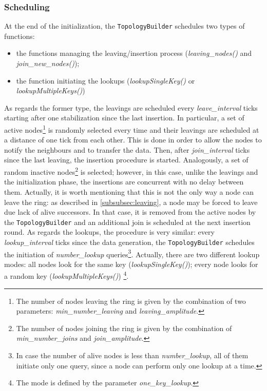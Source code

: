 \documentclass[11pt,twocolumn,letterpaper]{article}
\begin{document}
	\subsubsection{Scheduling}
	\label{subsubsec:top-scheduling}
	At the end of the initialization, the \texttt{TopologyBuilder} schedules two types of functions:
	\begin{itemize}
		\item the functions managing the leaving/insertion process (\textit{leaving\_nodes()} and \textit{join\_new\_nodes()});
		\item the function initiating the lookups (\textit{lookupSingleKey()} or \textit{lookupMultipleKeys()})
	\end{itemize}
	As regards the former type, the leavings are scheduled every \textit{leave\_interval} ticks starting after one stabilization since the last insertion. In particular, a set of active nodes\footnote{The number of nodes leaving the ring is given by the combination of two parameters: \textit{min\_number\_leaving} and \textit{leaving\_amplitude}.} is randomly selected every time and their leavings are scheduled at a distance of one tick from each other. This is done in order to allow the nodes to notify the neighbours and to transfer the data. Then, after \textit{join\_interval} ticks since the last leaving, the insertion procedure is started. Analogously, a set of random inactive nodes\footnote{The number of nodes joining the ring is given by the combination of \textit{min\_number\_joins} and \textit{join\_amplitude}.} is selected; however, in this case, unlike the leavings and the initialization phase, the insertions are concurrent with no delay between them. \newline
	Actually, it is worth mentioning that this is not the only way a node can leave the ring: as described in \cref{subsubsec:leaving}, a node may be forced to leave due lack of alive successors. In that case, it is removed from the active nodes by the \texttt{TopologyBuilder} and an additional join is scheduled at the next insertion round.\newline
	As regards the lookups, the procedure is very similar: every \textit{lookup\_interval} ticks since the data generation, the \texttt{TopologyBuilder} schedules the initiation of \textit{number\_lookup} queries\footnote{In case the number of alive nodes is less than \textit{number\_lookup}, all of them initiate only one query, since a node can perform only one lookup at a time.}. Actually, there are two different lookup modes: all nodes look for the same key (\textit{lookupSingleKey()}); every node looks for a random key (\textit{lookupMultipleKeys()}) \footnote{The mode is defined by the parameter \textit{one\_key\_lookup}.}.
	
\end{document}

